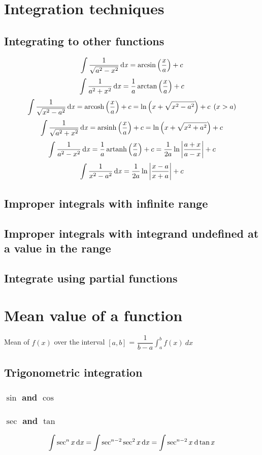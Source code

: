 \section{Integration techniques}
\subsection{Integrating to other functions}
\[\int \frac{1}{\sqrt{a^2-x^2}} \operatorname{\mathrm{d}\mathit{x}}=\arcsin \left(\frac{x}{a}\right) + c \]
\[\int \frac{1}{a^2+x^2} \operatorname{\mathrm{d}\mathit{x}}= \frac{1}{a}\arctan \left(\frac{x}{a}\right) + c \]
\[\int \frac{1}{\sqrt{x^2-a^2}} \operatorname{\mathrm{d}\mathit{x}}= \operatorname{arcosh} \left(\frac{x}{a}\right) + c = \ln \left(x + \sqrt{x^2-a^2}\right) + c \:\:  (x>a)\]
\[\int \frac{1}{\sqrt{a^2+x^2}} \operatorname{\mathrm{d}\mathit{x}}= \operatorname{arsinh} \left(\frac{x}{a}\right) + c = \ln \left(x + \sqrt{x^2+a^2}\right) + c \]
\[\int \frac{1}{a^2-x^2} \operatorname{\mathrm{d}\mathit{x}}=\frac{1}{a}\operatorname{artanh} \left(\frac{x}{a}\right) + c = \frac{1}{2a}\ln \left|\frac{a+x}{a-x}\right| + c\]
\[\int \frac{1}{x^2-a^2} \operatorname{\mathrm{d}\mathit{x}}= \frac{1}{2a}\ln \left|\frac{x-a}{x+a}\right| + c\]
\subsection{Improper integrals with infinite range}
\subsection{Improper integrals with integrand undefined at a value in the range}
\subsection{Integrate using partial functions}
\section{Mean value of a function}
Mean of $f(x)$ over the interval $[a,b]$ = $\dfrac{1}{b-a}\int_{a}^{b} f(x) \: dx$

\subsection{Trigonometric integration}
\subsubsection{$\sin$ and $\cos$}


\subsubsection{$\sec$ and $\tan$}
\[\int \sec^n x \operatorname{\mathrm{d}\mathit{x}} = \int \sec^{n-2} \sec^2 x \operatorname{\mathrm{d}\mathit{x}} = \int \sec^{n-2} x \: \mathrm{d} \tan x\]